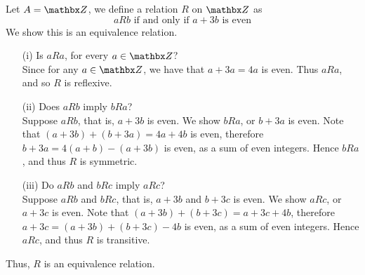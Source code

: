 \begin{example}
Let $A = \zz$, we define a relation $R$ on $\zz$ as
\[aRb \text{ if and only if } a + 3b \text{ is even}\]
We show this is an equivalence relation.
\begin{itemize}
\item[(i)] Is $aRa$, for every $a \in \zz$?\\[0.5em]
Since for any $a \in \zz$, we have that $a + 3a = 4a$ is even. Thus $aRa$, and so $R$ is reflexive.

\item[(ii)] Does $aRb$ imply $bRa$?\\[0.5em]
Suppose $aRb$, that is, $a + 3b$ is even. We show $bRa$, or $b + 3a$ is even. Note that $(a + 3b) + (b + 3a) = 4a + 4b$ is even, therefore $b + 3a = 4(a+b) - (a + 3b)$ is even, as a sum of even integers. Hence $bRa$, and thus $R$ is symmetric.

\item[(iii)] Do $aRb$ and $bRc$ imply $aRc$?\\[0.5em]
Suppose $aRb$ and $bRc$, that is, $a + 3b$ and $b + 3c$ is even. We show $aRc$, or $a + 3c$ is even. Note that $(a + 3b) + (b + 3c) = a + 3c + 4b$, therefore $a + 3c = (a + 3b) + (b + 3c) - 4b$ is even, as a sum of even integers. Hence $aRc$, and thus $R$ is transitive.
\end{itemize}
Thus, $R$ is an equivalence relation.

%
\end{example}

